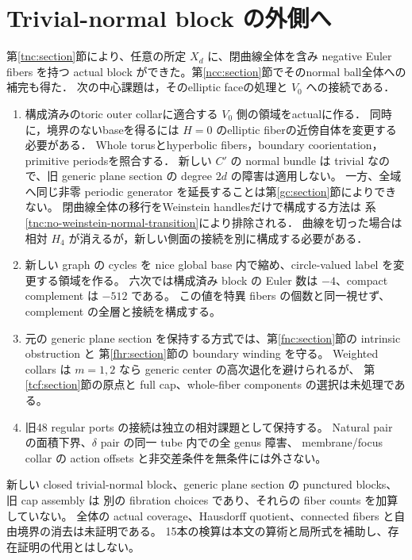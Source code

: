 \documentclass[11pt,a4paper]{article}
\theoremstyle{definition}
\begin{document}
\section{Trivial-normal block の外側へ}
\label{lc:next}

第\ref{tnc:section}節により、任意の所定 $X_d$ に、閉曲線全体を含み negative Euler fibers を持つ
actual block ができた。第\ref{ncc:section}節でそのnormal ball全体への補完も得た．
次の中心課題は，そのelliptic faceの処理と $V_0$ への接続である．

\begin{enumerate}
\item 構成済みのtoric outer collarに適合する $V_0$ 側の領域をactualに作る．
同時に，境界のないbaseを得るには $H=0$ のelliptic fiberの近傍自体を変更する必要がある．
Whole torusとhyperbolic fibers，boundary coorientation，primitive periodsを照合する．
新しい $C'$ の normal bundle は trivial なので、旧 generic plane section の degree $2d$ の障害は適用しない。
一方、全域へ同じ非零 periodic generator を延長することは第\ref{gc:section}節によりできない。
閉曲線全体の移行をWeinstein handlesだけで構成する方法は
系\ref{tnc:no-weinstein-normal-transition}により排除される．
曲線を切った場合は相対 $H_4$ が消えるが，新しい側面の接続を別に構成する必要がある．
\item 新しい graph の cycles を nice global base 内で縮め、circle-valued label を変更する領域を作る。
六次では構成済み block の Euler 数は $-4$、compact complement は $-512$ である。
この値を特異 fibers の個数と同一視せず、complement の全層と接続を構成する。
\item 元の generic plane section を保持する方式では、第\ref{fnc:section}節の intrinsic obstruction と
第\ref{fhr:section}節の boundary winding を守る。
Weighted collars は $m=1,2$ なら generic center の高次退化を避けられるが、
第\ref{tcf:section}節の原点と full cap、whole-fiber components の選択は未処理である。
\item 旧48 regular ports の接続は独立の相対課題として保持する。
Natural pair の面積下界、$\delta$ pair の同一 tube 内での全 genus 障害、
membrane/focus collar の action offsets と非交差条件を無条件には外さない。
\end{enumerate}

新しい closed trivial-normal block、generic plane section の punctured blocks、旧 cap assembly は
別の fibration choices であり、それらの fiber counts を加算していない。
全体の actual coverage、Hausdorff quotient、connected fibers と自由境界の消去は未証明である。
15本の検算は本文の算術と局所式を補助し、存在証明の代用とはしない。
\end{document}
